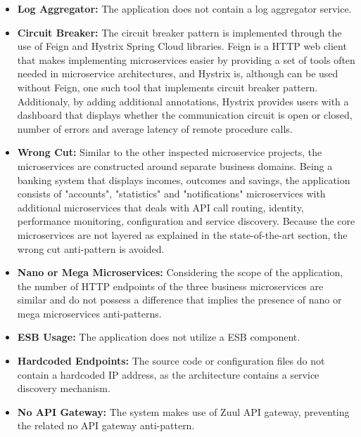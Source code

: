\documentclass{Configuration_Files/PoliMi3i_thesis}
\begin{document}
\begin{itemize}
    \item \textbf{Log Aggregator:} The application does not contain a log aggregator service.
    
    \item \textbf{Circuit Breaker:} The circuit breaker pattern is implemented through the use of Feign\footnotemark[80] and Hystrix Spring Cloud libraries.
    Feign is a HTTP web client that makes implementing microservices easier by providing a set of tools often needed in microservice architectures, and Hystrix is, although can be used without Feign, one such tool that implements circuit breaker pattern.
    Additionaly, by adding additional annotations, Hystrix provides users with a dashboard that displays whether the communication circuit is open or closed, number of errors and average latency of remote procedure calls.
    
    \item \textbf{Wrong Cut:} Similar to the other inspected microservice projects, the microservices are constructed around separate business domains.
    Being a banking system that displays incomes, outcomes and savings, the application consists of "accounts", "statistics" and "notifications" microservices with additional microservices that deals with API call routing, identity, performance monitoring, configuration and service discovery.
    Because the core microservices are not layered as explained in the state-of-the-art section, the wrong cut anti-pattern is avoided.
    
    \item \textbf{Nano or Mega Microservices:} Considering the scope of the application, the number of HTTP endpoints of the three business microservices are similar and do not possess a difference that implies the presence of nano or mega microservices anti-patterns.
    
    \item \textbf{ESB Usage:} The application does not utilize a ESB component.
    
    \item \textbf{Hardcoded Endpoints:} The source code or configuration files do not contain a hardcoded IP address, as the architecture contains a service discovery mechanism.
    
    \item \textbf{No API Gateway:} The system makes use of Zuul API gateway, preventing the related no API gateway anti-pattern.
    

\end{itemize}
\end{document}
